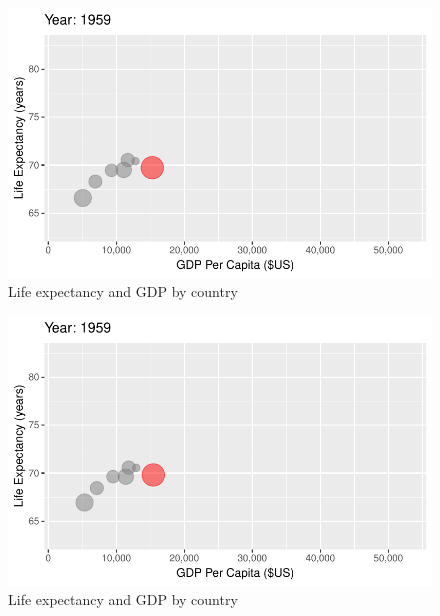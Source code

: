 \documentclass[
  letterpaper,
  DIV=11,
  numbers=noendperiod]{scrreport}
\theoremstyle{definition}
\theoremstyle{remark}
\begin{document}
\begin{figure}

{\centering \includegraphics{index_files/figure-pdf/fig-anim-country-13.pdf}

}

\caption{\label{fig-anim-country-13}Life expectancy and GDP by country}

\end{figure}

\begin{figure}

{\centering \includegraphics{index_files/figure-pdf/fig-anim-country-14.pdf}

}

\caption{\label{fig-anim-country-14}Life expectancy and GDP by country}

\end{figure}
\end{document}
